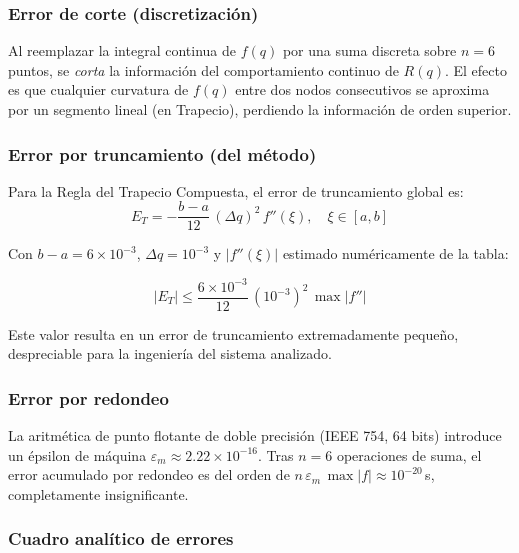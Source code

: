 \documentclass[12pt,a4paper]{article}
\begin{document}
\subsubsection*{Error de corte (discretización)}

Al reemplazar la integral continua de $f(q)$ por una suma discreta sobre
$n=6$ puntos, se \emph{corta} la información del comportamiento continuo de
$R(q)$. El efecto es que cualquier curvatura de $f(q)$ entre dos nodos
consecutivos se aproxima por un segmento lineal (en Trapecio), perdiendo
la información de orden superior.

\subsubsection*{Error por truncamiento (del método)}

Para la Regla del Trapecio Compuesta, el error de truncamiento global es:
\begin{equation}
    E_T = -\frac{b-a}{12}\,(\Delta q)^2\,f''(\xi),
    \quad \xi \in [a,b]
\end{equation}

Con $b-a = 6\times10^{-3}$, $\Delta q = 10^{-3}$ y $|f''(\xi)|$
estimado numéricamente de la tabla:

\begin{equation}
    |E_T| \leq \frac{6\times10^{-3}}{12}\,(10^{-3})^2\,\max|f''|
\end{equation}

Este valor resulta en un error de truncamiento extremadamente pequeño,
despreciable para la ingeniería del sistema analizado.

\subsubsection*{Error por redondeo}

La aritmética de punto flotante de doble precisión (IEEE 754, 64 bits)
introduce un épsilon de máquina $\varepsilon_m \approx 2.22\times10^{-16}$.
Tras $n=6$ operaciones de suma, el error acumulado por redondeo es del orden
de $n\,\varepsilon_m\,\max|f| \approx 10^{-20}$\,s, completamente
insignificante.

\subsubsection*{Cuadro analítico de errores}
\end{document}
